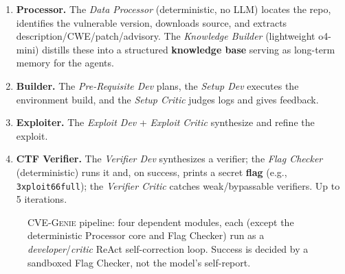 \documentclass[conference,10pt,a4paper]{IEEEtran}
\newcommand{\code}[1]{\texttt{\small #1}}
\begin{document}
\begin{enumerate}
\item \textbf{Processor.} The \textit{Data Processor} (deterministic, no LLM) locates the repo, identifies the vulnerable version, downloads source, and extracts description/CWE/patch/advisory. The \textit{Knowledge Builder} (lightweight o4-mini) distills these into a structured \textbf{knowledge base} serving as long-term memory for the agents.
\item \textbf{Builder.} The \textit{Pre-Requisite Dev} plans, the \textit{Setup Dev} executes the environment build, and the \textit{Setup Critic} judges logs and gives feedback.
\item \textbf{Exploiter.} The \textit{Exploit Dev} + \textit{Exploit Critic} synthesize and refine the exploit.
\item \textbf{CTF Verifier.} The \textit{Verifier Dev} synthesizes a verifier; the \textit{Flag Checker} (deterministic) runs it and, on success, prints a secret \textbf{flag} (e.g., \code{3xploit66full}); the \textit{Verifier Critic} catches weak/bypassable verifiers. Up to 5 iterations.
\end{enumerate}

\begin{figure}[t]
\centering
{}
\caption{CVE-G\textsc{enie} pipeline: four dependent modules, each (except the deterministic Processor core and Flag Checker) run as a \textit{developer}/\textit{critic} ReAct self-correction loop. Success is decided by a sandboxed Flag Checker, not the model's self-report.}
\label{fig:pipeline}
\end{figure}
\end{document}

